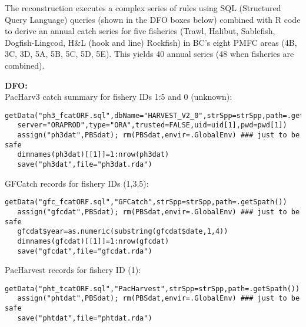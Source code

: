 \documentclass[letterpaper,12pt,fleqn]{article}
\def\tab{\hspace{0.5 in}}
\newcommand{\db}[1]{\small\textmd{\textsf{#1}}\normalsize}
\newcommand{\bold}[1]{{\bf #1}}
\begin{document}
\tab The reconstruction executes a complex series of rules using SQL (Structured Query Language) queries (shown in the DFO boxes below) combined with R code \citep{R-Core} to derive an annual catch series for five fisheries (Trawl, Halibut, Sablefish, Dogfish-Lingcod, H\&L (hook and line) Rockfish) in BC's eight PMFC areas (4B, 3C, 3D, 5A, 5B, 5C, 5D, 5E). This yields 40 annual series (48 when fisheries are combined).


\vspace*{2ex} 
\begin{dfobox} %
\color{blue}
\bold{DFO:}\\
\db{PacHarv3} catch summary for fishery IDs 1:5 and 0 (unknown):\vspace*{0.5ex}
\begin{Verbatim}[formatcom=\color{dodgerblue},fontsize=\footnotesize]
getData("ph3_fcatORF.sql",dbName="HARVEST_V2_0",strSpp=strSpp,path=.getSpath(),
   server="ORAPROD",type="ORA",trusted=FALSE,uid=uid[1],pwd=pwd[1])
   assign("ph3dat",PBSdat); rm(PBSdat,envir=.GlobalEnv) ### just to be safe
   dimnames(ph3dat)[[1]]=1:nrow(ph3dat)
   save("ph3dat",file="ph3dat.rda")
\end{Verbatim}
\end{dfobox}

\vspace*{2ex} 
\begin{dfobox} %
\color{blue}
\db{GFCatch} records for fishery IDs (1,3,5):\vspace*{0.5ex}
\begin{Verbatim}[formatcom=\color{dodgerblue},fontsize=\footnotesize]
getData("gfc_fcatORF.sql","GFCatch",strSpp=strSpp,path=.getSpath())
   assign("gfcdat",PBSdat); rm(PBSdat,envir=.GlobalEnv) ### just to be safe
   gfcdat$year=as.numeric(substring(gfcdat$date,1,4))
   dimnames(gfcdat)[[1]]=1:nrow(gfcdat)
   save("gfcdat",file="gfcdat.rda")
\end{Verbatim}
\end{dfobox}

\vspace*{2ex} 
\begin{dfobox} %
\color{blue}
\db{PacHarvest} records for fishery ID (1):\vspace*{0.5ex}
\begin{Verbatim}[formatcom=\color{dodgerblue},fontsize=\footnotesize]
getData("pht_tcatORF.sql","PacHarvest",strSpp=strSpp,path=.getSpath())
   assign("phtdat",PBSdat); rm(PBSdat,envir=.GlobalEnv) ### just to be safe
   save("phtdat",file="phtdat.rda")
\end{Verbatim}
\end{dfobox}
\end{document}
